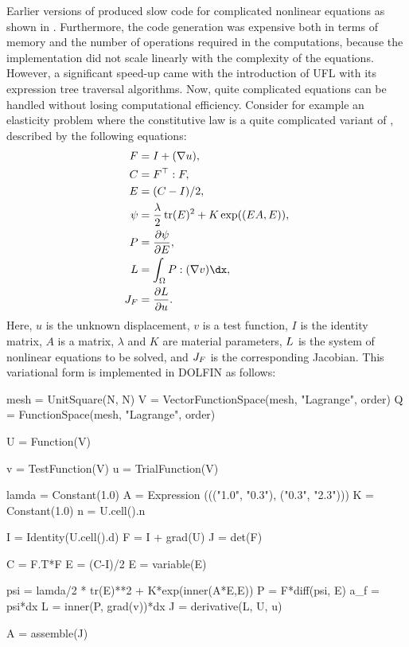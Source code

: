 Earlier versions of \sfc{} produced slow code for complicated nonlinear
equations as shown in \citet{AlnaesMardal2009b}. Furthermore, the code
generation was expensive both in terms of memory and the number of
operations required in the computations, because the \sfc{} implementation
did not scale linearly with the complexity of the equations.  However, a
significant speed-up came with the introduction of UFL with its expression
tree traversal algorithms.  Now, quite complicated equations can be
handled without losing computational efficiency. Consider for example
an elasticity problem where the constitutive law is a quite complicated
variant of \citet{Fung1993}, described by the following equations:
%
\begin{align}
F &= I + (\nabla u), \\
C &= F^{\top}: F, \\
E &= (C-I)/2, \\
\psi &= \frac{\lambda}{2} \, \mbox{tr}(E)^2 + K\exp((E A,E)), \\
P &= \frac{\partial \psi}{\partial E}, \\
\LL &= \int_\Omega P: (\nabla v) \dx, \\
\JJ_F &= \frac{\partial \LL}{\partial u}.
\end{align}
Here, $u$ is the unknown displacement, $v$ is a
test function, $I$ is the identity matrix, $A$ is a
matrix, $\lambda$ and $K$ are material parameters, $L$ is the system
of nonlinear equations to be solved, and $J_F$ is the corresponding
Jacobian.  This variational form is implemented in DOLFIN as follows:
\begin{python}
mesh = UnitSquare(N, N)
V = VectorFunctionSpace(mesh, "Lagrange", order)
Q = FunctionSpace(mesh, "Lagrange", order)

U = Function(V)

v = TestFunction(V)
u = TrialFunction(V)

lamda = Constant(1.0)
A = Expression ((("1.0", "0.3"), ("0.3", "2.3")))
K = Constant(1.0)
n = U.cell().n

I = Identity(U.cell().d)
F = I + grad(U)
J = det(F)

C = F.T*F
E = (C-I)/2
E = variable(E)

psi = lamda/2 * tr(E)**2  +  K*exp(inner(A*E,E))
P = F*diff(psi, E)
a_f = psi*dx
L = inner(P, grad(v))*dx
J = derivative(L, U, u)

A = assemble(J)
\end{python}

